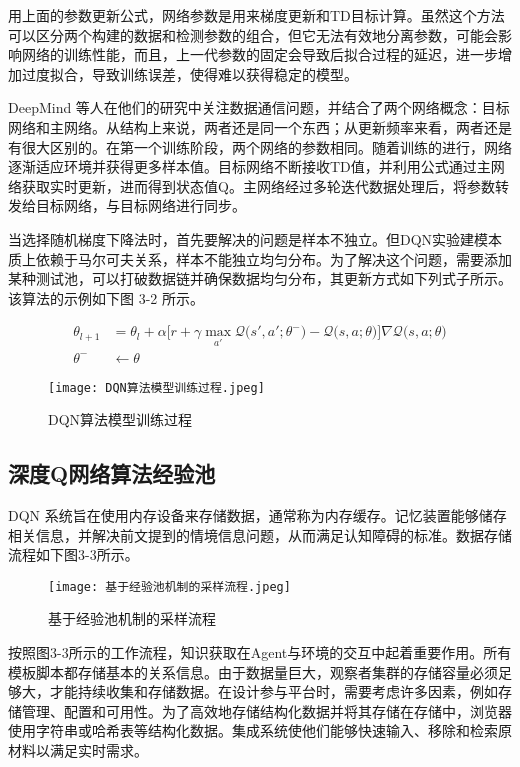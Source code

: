 用上面的参数更新公式，网络参数是用来梯度更新和TD目标计算。虽然这个方法可以区分两个构建的数据和检测参数的组合，但它无法有效地分离参数，可能会影响网络的训练性能，而且，上一代参数的固定会导致后拟合过程的延迟，进一步增加过度拟合，导致训练误差，使得难以获得稳定的模型。

DeepMind 等人在他们的研究中关注数据通信问题，并结合了两个网络概念：目标网络和主网络。从结构上来说，两者还是同一个东西；从更新频率来看，两者还是有很大区别的。在第一个训练阶段，两个网络的参数相同。随着训练的进行，网络逐渐适应环境并获得更多样本值。目标网络不断接收TD值，并利用公式通过主网络获取实时更新，进而得到状态值Q。主网络经过多轮迭代数据处理后，将参数转发给目标网络，与目标网络进行同步。

当选择随机梯度下降法时，首先要解决的问题是样本不独立。但DQN实验建模本质上依赖于马尔可夫关系，样本不能独立均匀分布。为了解决这个问题，需要添加某种测试池，可以打破数据链并确保数据均匀分布，其更新方式如下列式子所示。该算法的示例如下图 3-2 所示。

\begin{align}
	\theta_{l+1} &= \theta_l + \alpha \bigg[ r + \gamma \max_{a'} \mathcal{Q}\Big(s', a'; \theta^- \Big) - \mathcal{Q}\big(s, a; \theta\big) \bigg] \nabla \mathcal{Q}\big(s, a; \theta\big) \\
	\theta^- &\leftarrow \theta
\end{align}

\begin{figure}[hbt]
	\centering
	\texttt{[image: DQN算法模型训练过程.jpeg]}
	\caption{DQN算法模型训练过程}
	\label{f.example}
\end{figure}

\subsection{深度Q网络算法经验池}

DQN 系统旨在使用内存设备来存储数据，通常称为内存缓存\cite{wawrzynski2013autonomous}。记忆装置能够储存相关信息，并解决前文提到的情境信息问题，从而满足认知障碍的标准。数据存储流程如下图3-3所示。

\begin{figure}[hbt]
	\centering
	\texttt{[image: 基于经验池机制的采样流程.jpeg]}
	\caption{基于经验池机制的采样流程}
	\label{f.example}
\end{figure}

按照图3-3所示的工作流程，知识获取在Agent与环境的交互中起着重要作用。所有模板脚本都存储基本的关系信息。由于数据量巨大，观察者集群的存储容量必须足够大，才能持续收集和存储数据。在设计参与平台时，需要考虑许多因素，例如存储管理、配置和可用性。为了高效地存储结构化数据并将其存储在存储中，浏览器使用字符串或哈希表等结构化数据。集成系统使他们能够快速输入、移除和检索原材料以满足实时需求。

